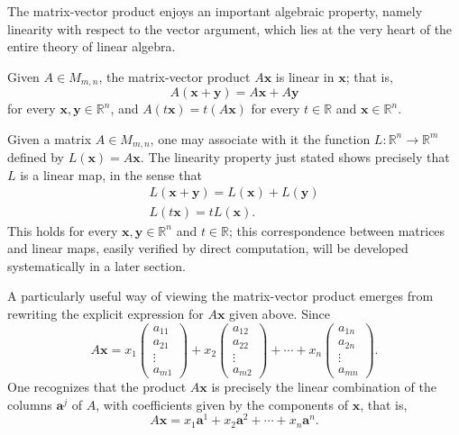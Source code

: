 The matrix-vector product enjoys an important algebraic property, namely linearity with respect to the vector argument, which lies at the very heart of the entire theory of linear algebra.

\begin{theorem}
Given $A \in M_{m,n}$, the matrix-vector product $A\mathbf{x}$ is linear in $\mathbf{x}$; that is,
\[
A(\mathbf{x}+\mathbf{y}) = A\mathbf{x} + A\mathbf{y}
\]
 for every $\mathbf{x}, \mathbf{y} \in \mathbb{R}^n$, and $A(t\mathbf{x}) = t(A\mathbf{x})$ for every $t \in \mathbb{R}$ and $\mathbf{x} \in \mathbb{R}^n$.
\end{theorem}

Given a matrix $A \in M_{m,n}$, one may associate with it the function $L : \mathbb{R}^n \to \mathbb{R}^m$ defined by $L(\mathbf{x}) = A\mathbf{x}$. The linearity property just stated shows precisely that $L$ is a linear map, in the sense that
\[
\begin{gathered}
L(\mathbf{x} + \mathbf{y}) = L(\mathbf{x}) + L(\mathbf{y}) \\
L(t\mathbf{x}) = t L(\mathbf{x}).
\end{gathered}
\]
This holds for every $\mathbf{x}, \mathbf{y} \in \mathbb{R}^n$ and $t \in \mathbb{R}$; this correspondence between matrices and linear maps, easily verified by direct computation, will be developed systematically in a later section.

A particularly useful way of viewing the matrix-vector product emerges from rewriting the explicit expression for $A\mathbf{x}$ given above. Since
\[
A\mathbf{x} =
x_1 \begin{pmatrix} a_{11} \\ a_{21} \\ \vdots \\ a_{m1} \end{pmatrix}
+ x_2 \begin{pmatrix} a_{12} \\ a_{22} \\ \vdots \\ a_{m2} \end{pmatrix}
+ \cdots +
x_n \begin{pmatrix} a_{1n} \\ a_{2n} \\ \vdots \\ a_{mn} \end{pmatrix}.
\]
One recognizes that the product $A\mathbf{x}$ is precisely the linear combination of the columns $\mathbf{a}^j$ of $A$, with coefficients given by the components of $\mathbf{x}$, that is,
\[
A\mathbf{x} = x_1 \mathbf{a}^1 + x_2 \mathbf{a}^2 + \cdots + x_n \mathbf{a}^n.
\]

